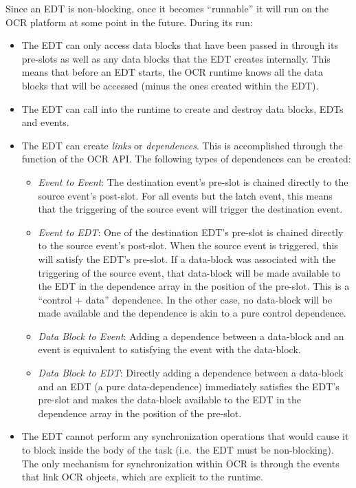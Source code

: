 Since an EDT is non-blocking, once it
becomes ``runnable'' it will run on the OCR platform at some point in the
future. During its run:
\begin{itemize}
\item The EDT can only access data blocks that have been passed in
through its pre-slots as well as any data blocks that the EDT creates
internally. This means that before an EDT starts, the OCR runtime
knows all the data blocks that will be accessed (minus the ones
created within the EDT).

\item The EDT can call into the runtime to create and destroy data
blocks, EDTs and events.

\item The EDT can create \emph{links} or \emph{dependences}. This is
accomplished through the  function of the OCR
API. The following types of dependences can be created:
\begin{itemize}
\item \emph{Event to Event}: The destination event’s pre-slot is chained
directly to the source event’s post-slot.
For all events but the latch event, this means that the triggering of
the source event will trigger the destination event.

\item \emph{Event to EDT}:  One of the destination EDT’s pre-slot is chained
directly to the source event’s post-slot. When the source event is
triggered, this will satisfy the EDT’s pre-slot. If a data-block was
associated with the triggering of the source event, that data-block
will be made available to the EDT in the dependence array in the
position of the pre-slot. This is a “control + data” dependence. In
the other case, no data-block will be made available and the
dependence is akin to a pure control dependence.

\item \emph{Data Block to Event}: Adding a dependence between a data-block and an
event is equivalent to satisfying the event with the data-block.

\item \emph{Data Block to EDT}:  Directly adding a dependence between a data-block and
an EDT (a pure data-dependence) immediately satisfies the EDT’s
pre-slot and makes the data-block available to the EDT in the
dependence array in the position of the pre-slot.

\end{itemize}

\item The EDT cannot perform any synchronization operations that would
cause it to block inside the body of the task (i.e.\ the EDT must be
non-blocking). The only mechanism for synchronization within OCR is
through the events that link OCR objects, which are explicit to the
runtime.

\end{itemize}


